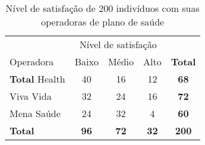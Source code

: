 \begin{table}[htpb]
    \centering
    \begin{tabular}{lcccc}
        \toprule
                     & \multicolumn{3}{c}{Nível de satisfação} & \\
                     \cmidrule(lr){2-4}
        Operadora    & Baixo       & Médio       & Alto        & \textbf{Total} \\
        \midrule
        \textbf{Total} Health & 40          & 16          & 12          & \textbf{68} \\
        Viva Vida    & 32          & 24          & 16          & \textbf{72} \\
        Mena Saúde   & 24          & 32          & 4           & \textbf{60} \\
        \textbf{Total}        & \textbf{96} & \textbf{72} & \textbf{32} & \textbf{200} \\
        \bottomrule
    \end{tabular}
    \caption{Nível de satisfação de 200 indivíduos com suas operadoras de plano de saúde}
    \label{tab:satisfacao-operadora}
\end{table}

